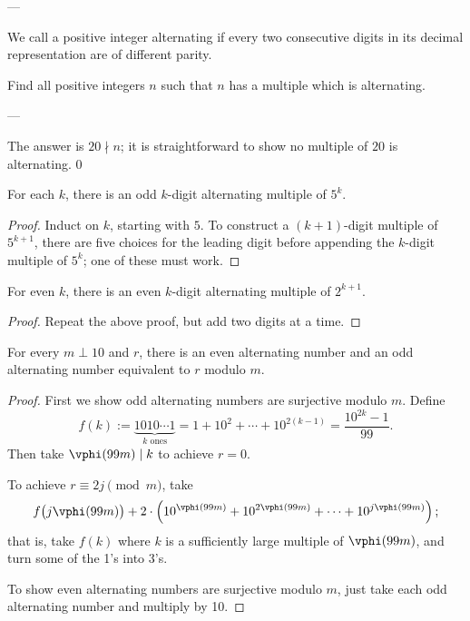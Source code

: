 
---

We call a positive integer alternating if every two consecutive digits in its decimal representation are of different parity.

Find all positive integers $n$ such that $n$ has a multiple which is alternating.

---

The answer is $20\nmid n$; it is straightforward to show no multiple of $20$ is alternating.
\setcounter{lemma}0
\begin{lemma}
    For each $k$, there is an odd $k$-digit alternating multiple of $5^k$.
\end{lemma}
\begin{proof}
    Induct on $k$, starting with $5$. To construct a $(k+1)$-digit multiple of $5^{k+1}$, there are five choices for the leading digit before appending the $k$-digit multiple of $5^k$; one of these must work.
\end{proof}
\begin{lemma}
    For even $k$, there is an even $k$-digit alternating multiple of $2^{k+1}$.
\end{lemma}
\begin{proof}
    Repeat the above proof, but add two digits at a time.
\end{proof}
\begin{claim*}
    For every $m\perp10$ and $r$, there is an even alternating number and an odd alternating number equivalent to $r$ modulo $m$.
\end{claim*}
\begin{proof}
    First we show odd alternating numbers are surjective modulo $m$. Define \[f(k):=\underbrace{1010\cdots1}_{k\text{ ones}}=1+10^2+\cdots+10^{2(k-1)}=\frac{10^{2k}-1}{99}.\]
    Then take $\vphi(99m)\mid k$ to achieve $r=0$.

    To achieve $r\equiv2j\pmod m$, take \[f\big(j\vphi(99m)\big)+2\cdot\left(10^{\vphi(99m)}+10^{2\vphi(99m)}+\cdots+10^{j\vphi(99m)}\right);\]
    that is, take $f(k)$ where $k$ is a sufficiently large multiple of $\vphi(99m)$, and turn some of the 1's into 3's.

    To show even alternating numbers are surjective modulo $m$, just take each odd alternating number and multiply by 10.
\end{proof}

